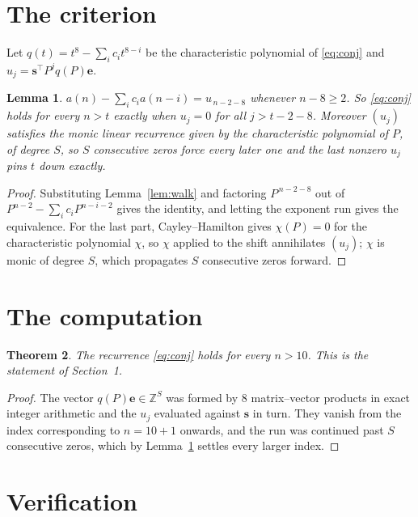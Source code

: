 \documentclass[11pt,a4paper]{article}
\theoremstyle{plain}
\newtheorem{theorem}{Theorem}
\newtheorem{lemma}[theorem]{Lemma}
\theoremstyle{definition}
\begin{document}
\section{The criterion}

Let $q(t)=t^{8}-\sum_i c_i t^{8-i}$ be the characteristic polynomial of
\eqref{eq:conj} and $u_j=\mathbf{s}^{\!\top}P^{j}q(P)\mathbf{e}$.

\begin{lemma}\label{lem:crit}
$a(n)-\sum_i c_i a(n-i)=u_{\,n-2-8}$ whenever $n-8\ge2$. So \eqref{eq:conj}
holds for every $n>t$ exactly when $u_j=0$ for all $j>t-2-8$. Moreover $(u_j)$
satisfies the monic linear recurrence given by the characteristic polynomial of $P$, of
degree $S$, so $S$ consecutive zeros force every later one and the last nonzero $u_j$ pins
$t$ down exactly.
\end{lemma}

\begin{proof}
Substituting Lemma~\ref{lem:walk} and factoring $P^{\,n-2-8}$ out of
$P^{n-2}-\sum_i c_i P^{n-i-2}$ gives the identity, and letting the exponent run gives the
equivalence. For the last part, Cayley--Hamilton gives $\chi(P)=0$ for the characteristic
polynomial $\chi$, so $\chi$ applied to the shift annihilates $(u_j)$; $\chi$ is monic of
degree $S$, which propagates $S$ consecutive zeros forward.
\end{proof}

\section{The computation}

\begin{theorem}
The recurrence \eqref{eq:conj} holds for every $n>10$. This is the statement of
Section~1.
\end{theorem}

\begin{proof}
The vector $q(P)\mathbf{e}\in\mathbb{Z}^{S}$ was formed by $8$ matrix--vector
products in exact integer arithmetic and the $u_j$ evaluated against $\mathbf{s}$ in turn.
They vanish from the index corresponding to $n=10+1$ onwards, and the run was continued
past $S$ consecutive zeros, which by Lemma~\ref{lem:crit} settles every larger index.
\end{proof}

\section{Verification}
\end{document}
